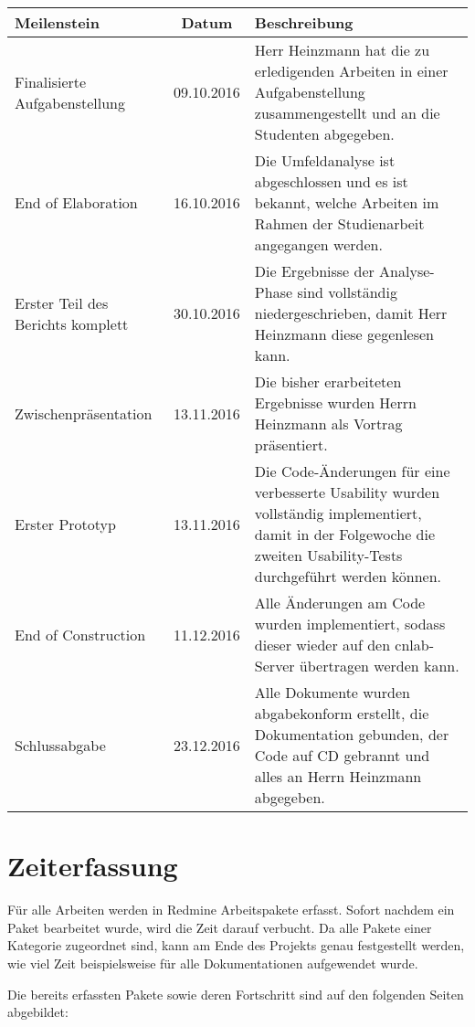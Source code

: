  \begin{tabularx}{\linewidth}{|X|c|X|}
 	\hline
 	\textbf{Meilenstein} & \textbf{Datum} & \textbf{Beschreibung} \\
 	\hline
 	Finalisierte Aufgabenstellung & 09.10.2016 & Herr Heinzmann hat die zu erledigenden Arbeiten in einer Aufgabenstellung zusammengestellt und an die Studenten abgegeben. \\
 	\hline
 	End of Elaboration & 16.10.2016 & Die Umfeldanalyse ist abgeschlossen und es ist bekannt, welche Arbeiten im Rahmen der Studienarbeit angegangen werden. \\
 	\hline
 	Erster Teil des Berichts komplett & 30.10.2016 & Die Ergebnisse der Analyse-Phase sind vollständig niedergeschrieben, damit Herr Heinzmann diese gegenlesen kann. \\
 	\hline
 	Zwischenpräsentation & 13.11.2016 & Die bisher erarbeiteten Ergebnisse wurden Herrn Heinzmann als Vortrag präsentiert. \\
 	\hline
 	Erster Prototyp & 13.11.2016 & Die Code-Änderungen für eine verbesserte Usability wurden vollständig implementiert, damit in der Folgewoche die zweiten Usability-Tests durchgeführt werden können. \\
 	\hline
 	End of Construction & 11.12.2016 & Alle Änderungen am Code wurden implementiert, sodass dieser wieder auf den cnlab-Server übertragen werden kann. \\
 	\hline
 	Schlussabgabe & 23.12.2016 & Alle Dokumente wurden abgabekonform erstellt, die Dokumentation gebunden, der Code auf CD gebrannt und alles an Herrn Heinzmann abgegeben. \\
 	\hline
 \end{tabularx}
 
 
 
 \section{Zeiterfassung}
 Für alle Arbeiten werden in Redmine Arbeitspakete erfasst. Sofort nachdem ein Paket bearbeitet wurde, wird die Zeit darauf verbucht. Da alle Pakete einer Kategorie zugeordnet sind, kann am Ende des Projekts genau festgestellt werden, wie viel Zeit beispielsweise für alle Dokumentationen aufgewendet wurde.
 
 Die bereits erfassten Pakete sowie deren Fortschritt sind auf den folgenden Seiten abgebildet:
 
 
